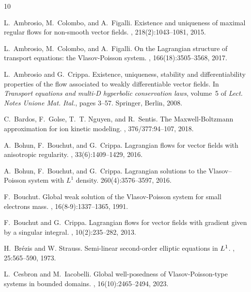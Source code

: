 \documentclass[11pt,reqno,a4paper]{amsart}
\theoremstyle{definition}
\theoremstyle{remark}
\numberwithin{equation}{section}
\begin{document}
\begin{thebibliography}{10}

L.~Ambrosio, M.~Colombo, and A.~Figalli.
\newblock Existence and uniqueness of maximal regular flows for non-smooth
  vector fields.
, 218(2):1043--1081, 2015.

L.~Ambrosio, M.~Colombo, and A.~Figalli.
\newblock On the {L}agrangian structure of transport equations: the
  {V}lasov-{P}oisson system.
, 166(18):3505--3568, 2017.

L.~Ambrosio and G.~Crippa.
\newblock Existence, uniqueness, stability and differentiability properties of
  the flow associated to weakly differentiable vector fields.
\newblock In {\em Transport equations and multi-{D} hyperbolic conservation
  laws}, volume~5 of {\em Lect. Notes Unione Mat. Ital.}, pages 3--57.
  Springer, Berlin, 2008.


C.~Bardos, F.~Golse, T.~T. Nguyen, and R.~Sentis.
\newblock The {M}axwell-{B}oltzmann approximation for ion kinetic modeling.
, 376/377:94--107, 2018.

A.~Bohun, F.~Bouchut, and G.~Crippa.
\newblock Lagrangian flows for vector fields with anisotropic regularity.
,
  33(6):1409--1429, 2016.

A.~Bohun, F.~Bouchut, and G.~Crippa.
\newblock Lagrangian solutions to the Vlasov--Poisson system with $L^1$ density.
 260(4):3576--3597, 2016.

F.~Bouchut.
\newblock Global weak solution of the {V}lasov-{P}oisson system for small
  electrons mass.
, 16(8-9):1337--1365, 1991.

F.~Bouchut and G.~Crippa.
\newblock Lagrangian flows for vector fields with gradient given by a singular integral.
, 10(2):235--282, 2013. 


H.~Br\'ezis and W. Strauss.
\newblock Semi-linear second-order elliptic equations in {$L\sp{1}$}.
, 25:565--590, 1973.

L.~Cesbron and M.~Iacobelli.
\newblock Global well-posedness of {V}lasov-{P}oisson-type systems in bounded
  domains.
, 16(10):2465--2494, 2023.


\end{thebibliography}
\end{document}
